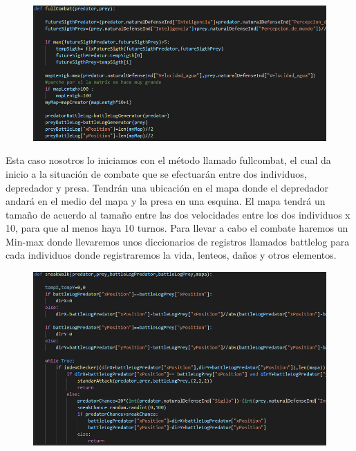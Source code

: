 \documentclass{llncs}
\begin{document}
\begin{figure}
	\centering
	\includegraphics[width=0.7\linewidth]{imagenesMisc/fullCombat}
	\label{fig:fullcombat}
\end{figure}

Esta caso nosotros lo iniciamos con el método llamado fullcombat, el cual da inicio a la situación de combate que se efectuarán entre dos individuos, depredador y presa. Tendrán una ubicación en el mapa donde el depredador andará en el medio del mapa y la presa en una esquina. El mapa tendrá un tamaño de acuerdo al tamaño entre las dos velocidades entre los dos individuos x 10, para que al menos haya 10 turnos.
\newline
\newline
Para llevar a cabo el combate haremos un Min-max donde llevaremos unos diccionarios de registros llamados battlelog para cada individuos donde registraremos la vida, lenteos, daños y otros elementos.

\begin{figure}
	\centering
	\includegraphics[width=0.7\linewidth]{imagenesMisc/sneakwalk}
	\label{fig:sneakwalk}
\end{figure}
\end{document}
